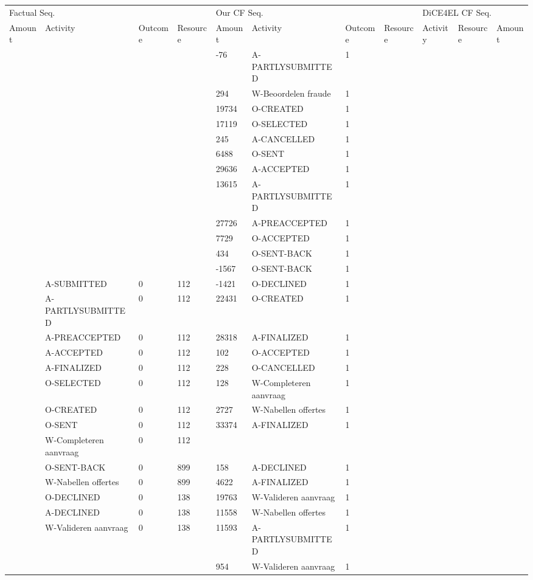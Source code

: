 \begin{tabular}{lllllllllll}
\toprule
\multicolumn{4}{l}{Factual Seq.} & \multicolumn{4}{l}{Our CF Seq.} & \multicolumn{3}{l}{DiCE4EL CF Seq.} \\
Amount & Activity & Outcome & Resource & Amount & Activity & Outcome & Resource & Activity & Resource & Amount \\
\midrule
 &  &  &  & -76 & A-PARTLYSUBMITTED & 1 &  &  &  &  \\
 &  &  &  & 294 & W-Beoordelen fraude & 1 &  &  &  &  \\
 &  &  &  & 19734 & O-CREATED & 1 &  &  &  &  \\
 &  &  &  & 17119 & O-SELECTED & 1 &  &  &  &  \\
 &  &  &  & 245 & A-CANCELLED & 1 &  &  &  &  \\
 &  &  &  & 6488 & O-SENT & 1 &  &  &  &  \\
 &  &  &  & 29636 & A-ACCEPTED & 1 &  &  &  &  \\
 &  &  &  & 13615 & A-PARTLYSUBMITTED & 1 &  &  &  &  \\
 &  &  &  & 27726 & A-PREACCEPTED & 1 &  &  &  &  \\
 &  &  &  & 7729 & O-ACCEPTED & 1 &  &  &  &  \\
 &  &  &  & 434 & O-SENT-BACK & 1 &  &  &  &  \\
 &  &  &  & -1567 & O-SENT-BACK & 1 &  &  &  &  \\
 & A-SUBMITTED & 0 & 112 & -1421 & O-DECLINED & 1 &  &  &  &  \\
 & A-PARTLYSUBMITTED & 0 & 112 & 22431 & O-CREATED & 1 &  &  &  &  \\
 & A-PREACCEPTED & 0 & 112 & 28318 & A-FINALIZED & 1 &  &  &  &  \\
 & A-ACCEPTED & 0 & 112 & 102 & O-ACCEPTED & 1 &  &  &  &  \\
 & A-FINALIZED & 0 & 112 & 228 & O-CANCELLED & 1 &  &  &  &  \\
 & O-SELECTED & 0 & 112 & 128 & W-Completeren aanvraag & 1 &  &  &  &  \\
 & O-CREATED & 0 & 112 & 2727 & W-Nabellen offertes & 1 &  &  &  &  \\
 & O-SENT & 0 & 112 & 33374 & A-FINALIZED & 1 &  &  &  &  \\
 & W-Completeren aanvraag & 0 & 112 &  &  &  &  &  &  &  \\
 & O-SENT-BACK & 0 & 899 & 158 & A-DECLINED & 1 &  &  &  &  \\
 & W-Nabellen offertes & 0 & 899 & 4622 & A-FINALIZED & 1 &  &  &  &  \\
 & O-DECLINED & 0 & 138 & 19763 & W-Valideren aanvraag & 1 &  &  &  &  \\
 & A-DECLINED & 0 & 138 & 11558 & W-Nabellen offertes & 1 &  &  &  &  \\
 & W-Valideren aanvraag & 0 & 138 & 11593 & A-PARTLYSUBMITTED & 1 &  &  &  &  \\
 &  &  &  & 954 & W-Valideren aanvraag & 1 &  &  &  &  \\
\bottomrule
\end{tabular}
